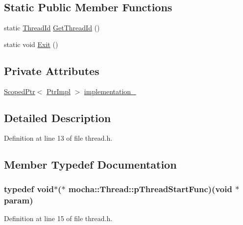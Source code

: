 \subsection*{Static Public Member Functions}
\begin{DoxyCompactItemize}
\item 
static \hyperlink{namespacemocha_a9fcf48a10671a66cd922f7e21d6efb6b}{ThreadId} \hyperlink{classmocha_1_1_thread_abc15368799ec10b5a8e52fb06bb0358b}{GetThreadId} ()
\item 
static void \hyperlink{classmocha_1_1_thread_aac480a3452e0cd2a6c2c94825e66178c}{Exit} ()
\end{DoxyCompactItemize}
\subsection*{Private Attributes}
\begin{DoxyCompactItemize}
\item 
\hyperlink{classmocha_1_1_scoped_ptr}{ScopedPtr}$<$ \hyperlink{classmocha_1_1_thread_1_1_ptr_impl}{PtrImpl} $>$ \hyperlink{classmocha_1_1_thread_a84ed7dce54ad56eaeb4165cd2d5a01d7}{implementation\_\-}
\end{DoxyCompactItemize}


\subsection{Detailed Description}


Definition at line 13 of file thread.h.



\subsection{Member Typedef Documentation}
\hypertarget{classmocha_1_1_thread_a916d7338f2a6d6ae046f89c9d46b0afa}{
\subsubsection[{pThreadStartFunc}]{\setlength{\rightskip}{0pt plus 5cm}typedef void$\ast$($\ast$ {\bf mocha::Thread::pThreadStartFunc})(void $\ast$param)}}
\label{classmocha_1_1_thread_a916d7338f2a6d6ae046f89c9d46b0afa}


Definition at line 15 of file thread.h.



